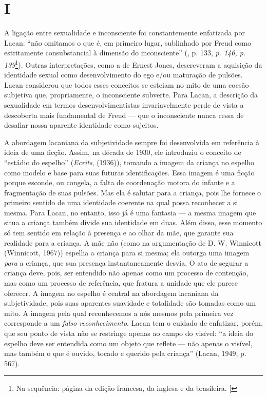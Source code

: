 \section{I}

A ligação entre sexualidade e inconsciente foi constantemente enfatizada
por Lacan: ``não omitamos o que é, em primeiro lugar, sublinhado por
Freud como estritamente consubstancial à dimensão do inconsciente''
(, p. 133, \emph{p. 146, p. 139}\footnote{Na sequência: página da
  edição francesa, da inglesa e da brasileira. {[}\versal{N.~T.}{]}}). Outras
interpretações, como a de Ernest Jones, descreveram a aquisição da
identidade sexual como desenvolvimento do ego e/ou maturação de pulsões.
Lacan considerou que todos esses conceitos se esteiam no mito de uma
coesão subjetiva que, propriamente, o inconsciente subverte. Para Lacan,
a descrição da sexualidade em termos desenvolvimentistas invariavelmente
perde de vista a descoberta mais fundamental de Freud --- que o
inconsciente nunca cessa de desafiar nossa aparente identidade como
sujeitos.

A abordagem lacaniana da subjetividade sempre foi desenvolvida em
referência à ideia de uma ficção. Assim, na década de 1930, ele
introduziu o conceito de ``estádio do espelho'' (\emph{Ecrits}, (1936)),
tomando a imagem da criança no espelho como modelo e base para suas
futuras identificações. Essa imagem é uma ficção porque esconde, ou
congela, a falta de coordenação motora do infante e a fragmentação de
suas pulsões. Mas ela é salutar para a criança, pois lhe fornece o
primeiro sentido de uma identidade coerente na qual possa reconhecer a
si mesma. Para Lacan, no entanto, isso já é uma fantasia --- a mesma
imagem que situa a criança também divide sua identidade em duas. Além
disso, esse momento só tem sentido em relação à presença e ao olhar da
mãe, que garante sua realidade para a criança. A mãe não (como na
argumentação de D. W. Winnicott (Winnicott, 1967)) espelha a criança
para si mesma; ela outorga uma imagem \emph{para} a criança, que sua
presença instantaneamente desvia. O ato de segurar a criança deve, pois,
ser entendido não apenas como um processo de contenção, mas como um
processo de referência, que fratura a unidade que ele parece oferecer. A
imagem no espelho é central na abordagem lacaniana da subjetividade,
pois suas aparentes suavidade e totalidade são tomadas como um mito. A
imagem pela qual reconhecemos a nós mesmos pela primeira vez corresponde
a um \emph{falso reconhecimento}. Lacan tem o cuidado de enfatizar,
porém, que seu ponto de vista não se restringe apenas ao campo do
visível: ``a ideia do espelho deve ser entendida como um objeto que
reflete --- não apenas o visível, mas também o que é ouvido, tocado e
querido pela criança'' (Lacan, 1949, p. 567).

